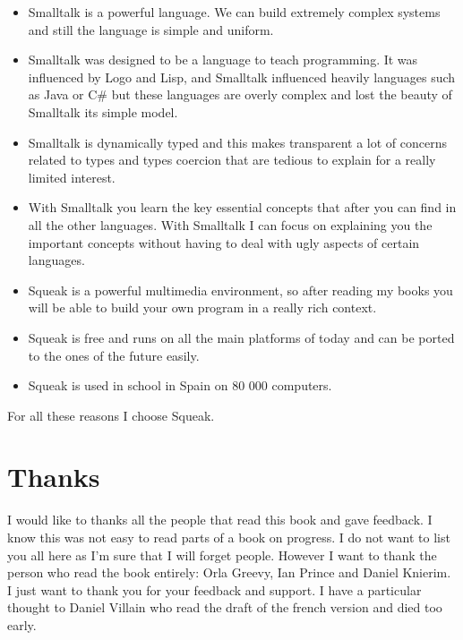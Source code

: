 \begin{itemize}
\item Smalltalk is a powerful language. We can build extremely complex systems and still the language is simple and uniform. 

\item Smalltalk was designed to be a language to teach programming. It was influenced by Logo and Lisp, and Smalltalk influenced heavily languages such as Java or C\# but these languages are overly complex and lost the beauty of Smalltalk its simple model. 

\item Smalltalk is dynamically typed and this makes transparent a lot of concerns related to types and types coercion that are tedious to explain for a really limited interest.

\item With Smalltalk you learn the key essential concepts that after you can find in all the other languages. With Smalltalk I can focus on explaining you the important concepts without having to deal with ugly aspects of certain languages. 


\item Squeak is a powerful multimedia environment, so after reading my books you will be able to build your own program in a really rich context. 

\item Squeak is free and runs on all the main platforms of today and can be ported to the ones of the future easily. 

\item Squeak is used in school in Spain on 80 000 computers. 
\end{itemize}

For all these reasons I choose Squeak. 



\section*{Thanks}
I would like to thanks all the people that read this book and gave feedback. I know this was not easy to read parts of a book on progress. I do not want to list you all here as I'm sure that I will forget people. However I want to thank the person who read the book entirely: Orla Greevy, Ian Prince and Daniel Knierim. I just want to thank you for your feedback and support. I have a particular thought to Daniel Villain who read the draft of the french version and died too early. 

